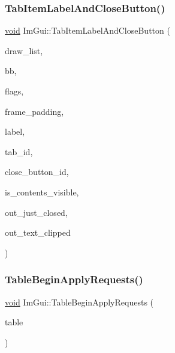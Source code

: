 \subsubsection{\texorpdfstring{Tab\+Item\+Label\+And\+Close\+Button()}{TabItemLabelAndCloseButton()}}
{\footnotesize\ttfamily \hyperlink{imgui__impl__opengl3__loader_8h_ac668e7cffd9e2e9cfee428b9b2f34fa7}{void} Im\+Gui\+::\+Tab\+Item\+Label\+And\+Close\+Button (\begin{DoxyParamCaption}\item[{\hyperlink{structImDrawList}{Im\+Draw\+List} $\ast$}]{draw\+\_\+list,  }\item[{const \hyperlink{structImRect}{Im\+Rect} \&}]{bb,  }\item[{Im\+Gui\+Tab\+Item\+Flags}]{flags,  }\item[{\hyperlink{structImVec2}{Im\+Vec2}}]{frame\+\_\+padding,  }\item[{const char $\ast$}]{label,  }\item[{Im\+Gui\+ID}]{tab\+\_\+id,  }\item[{Im\+Gui\+ID}]{close\+\_\+button\+\_\+id,  }\item[{bool}]{is\+\_\+contents\+\_\+visible,  }\item[{bool $\ast$}]{out\+\_\+just\+\_\+closed,  }\item[{bool $\ast$}]{out\+\_\+text\+\_\+clipped }\end{DoxyParamCaption})}

\mbox{\label{namespaceImGui_af4446a9e8b44157047d089fe4f0c738d}} 
\subsubsection{\texorpdfstring{Table\+Begin\+Apply\+Requests()}{TableBeginApplyRequests()}}
{\footnotesize\ttfamily \hyperlink{imgui__impl__opengl3__loader_8h_ac668e7cffd9e2e9cfee428b9b2f34fa7}{void} Im\+Gui\+::\+Table\+Begin\+Apply\+Requests (\begin{DoxyParamCaption}\item[{\hyperlink{structImGuiTable}{Im\+Gui\+Table} $\ast$}]{table }\end{DoxyParamCaption})}

\mbox{\label{namespaceImGui_ab6578920318c60f3a18daee1d8711103}} 
